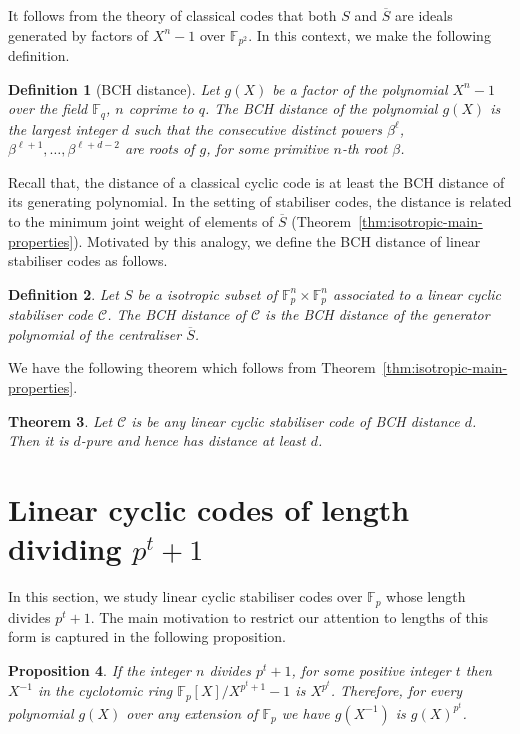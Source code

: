 \documentclass[conference]{IEEEtran}
\renewcommand{\=}{\approx}
\newcommand{\centraliser}[1]{\ensuremath{\overline{#1}}}
\newtheorem{theorem}{Theorem}[section]
\newtheorem{definition}[theorem]{Definition}
\newtheorem{proposition}[theorem]{Proposition}
\begin{document}
It follows from the theory of classical codes that both $S$ and
$\centraliser{S}$ are ideals generated by factors of $X^n -1$ over
$\mathbb{F}_{p^2}$. In this context, we make the following definition.

\begin{definition}[BCH distance]
  Let $g(X)$ be a factor of the polynomial $X^n - 1$ over the field
  $\mathbb{F}_q$, $n$ coprime to $q$. The \emph{BCH distance} of the
  polynomial $g(X)$ is the largest integer $d$ such that the
  consecutive distinct powers $\beta^{\ell}$,$\beta^{\ell+1},\ldots,
  \beta^{\ell + d -2}$ are roots of $g$, for some primitive $n$-th
  root $\beta$.
\end{definition}

Recall that, the distance of a classical cyclic code is at least the
BCH distance of its generating polynomial. In the setting of
stabiliser codes, the distance is related to the minimum joint weight
of elements of $\centraliser{S}$
(Theorem~\ref{thm:isotropic-main-properties}). Motivated by this
analogy, we define the BCH distance of linear stabiliser codes as
follows.

\begin{definition}
  Let $S$ be a isotropic subset of $\mathbb{F}_p^{n}\times
  \mathbb{F}_p^n$ associated to a linear cyclic stabiliser code
  $\mathcal{C}$. The \emph{BCH distance of $\mathcal{C}$} is the BCH
  distance of the generator polynomial of the centraliser
  $\centraliser{S}$.
\end{definition}

We have the following theorem which follows from
Theorem~\ref{thm:isotropic-main-properties}.

\begin{theorem}
  Let $\mathcal{C}$ is be any linear cyclic stabiliser code of BCH
  distance $d$. Then it is $d$-pure and hence has distance at least
  $d$.
\end{theorem}


\section{Linear cyclic codes of length dividing $p^{t}+1$}

In this section, we study linear cyclic stabiliser codes over
$\mathbb{F}_p$ whose length divides $p^{t} +1$. The main motivation to restrict
our attention to lengths of this form is captured in the following proposition.

\begin{proposition}\label{prop:inverse-frob}
If the integer $n$ divides $p^t+1$, for some positive integer $t$ then $X^{-1}$
in the cyclotomic
ring $\mathbb{F}_p[X]/X^{p^t+1} -1$ is $X^{p^{t}}$. Therefore, for
every polynomial $g(X)$ over any extension of $\mathbb{F}_p$ we have $g(X^{-1})$ is
$g(X)^{p^t}$.
\end{proposition}
\end{document}
